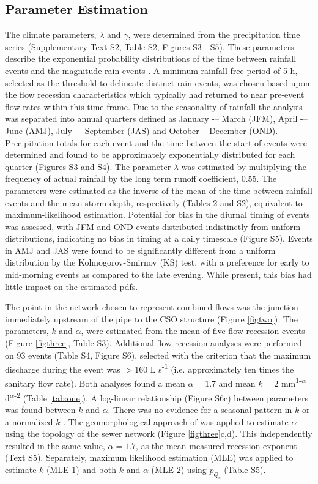 \documentclass{agujournal2018}
\begin{document}
\subsection{Parameter Estimation}
The climate parameters, $\lambda$ and $\gamma$, were determined from the precipitation time series (Supplementary Text S2, Table S2, Figures S3 - S5). These parameters describe the exponential probability distributions of the time between rainfall events and the magnitude rain events \citep{Rodriguez_Iturbe_1999}. A minimum rainfall-free period of 5 h, selected as the threshold to delineate distinct rain events, was chosen based upon the f\/low recession characteristics which typically had returned to near pre-event f\/low rates within this time-frame. Due to the seasonality of rainfall the analysis was separated into annual quarters def\/ined as January -– March (JFM), April -– June (AMJ), July -– September (JAS) and October -- December (OND). Precipitation totals for each event and the time between the start of events were determined and found to be approximately exponentially distributed for each quarter (Figures S3 and S4). The parameter $\lambda$ was estimated by multiplying the frequency of actual rainfall by the long term runof\/f coef\/f\/icient, 0.55. The parameters were estimated as the inverse of the mean of the time between rainfall events and the mean storm depth, respectively (Tables 2 and S2), equivalent to maximum-likelihood estimation. Potential for bias in the diurnal timing of events was assessed, with JFM and OND events distributed indistinctly from uniform distributions, indicating no bias in timing at a daily timescale (Figure S5). Events in AMJ and JAS were found to be signif\/icantly dif\/ferent from a uniform distribution by the Kolmogorov-Smirnov (KS) test, with a preference for early to mid-morning events as compared to the late evening. While present, this bias had little impact on the estimated pdfs.

The point in the network chosen to represent combined f\/lows was the junction immediately upstream of the pipe to the CSO structure (Figure \ref{figtwo}). The parameters, $k$ and $\alpha$, were estimated from the mean of f\/ive f\/low recession events \citep{Brutsaert_1977} (Figure \ref{figthree}, Table S3). Additional f\/low recession analyses were performed on 93 events (Table S4, Figure S6), selected with the criterion that the maximum discharge during the event was $>$160 L s\textsuperscript{-1} (i.e. approximately ten times the sanitary f\/low rate). Both analyses found a mean  $\alpha = 1.7$ and mean $k = 2$ mm\textsuperscript{1-$\alpha$} d\textsuperscript{$\alpha$-2} (Table \ref{tab:one}). A log-linear relationship (Figure S6c) between parameters was found between $k$ and $\alpha$. There was no evidence for a seasonal pattern in $k$ or a normalized $k$ \citep{Dralle_2015}. The geomorphological approach of \citet{Biswal_2014} was applied to estimate $\alpha$ using the topology of the sewer network (Figure \ref{figthree}c,d). This independently resulted in the same value, $\alpha = 1.7$, as the mean measured recession exponent (Text S5). Separately, maximum likelihood estimation (MLE) was applied to estimate $k$ (MLE 1) and both $k$ and $\alpha$ (MLE 2) using $p_{Q_c}$ (Table S5).
 
\end{document}
